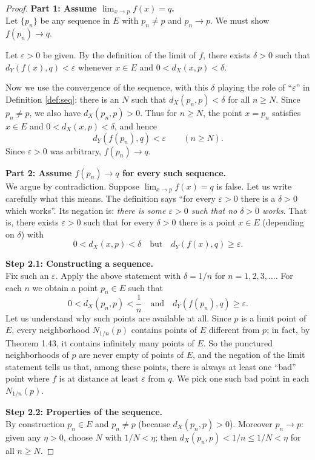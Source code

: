 \documentclass{article}
\theoremstyle{mythm}
\begin{document}
\begin{proof}
\textbf{Part 1: Assume $\lim_{x\to p} f(x) = q$.}\\
Let $\{p_n\}$ be any sequence in $E$ with $p_n \neq p$ and $p_n \to p$. We must show $f(p_n) \to q$.

Let $\varepsilon > 0$ be given. By the definition of the limit of $f$, there exists $\delta > 0$ such that $d_Y(f(x), q) < \varepsilon$ whenever $x \in E$ and $0 < d_X(x,p) < \delta$.

Now we use the convergence of the sequence, with this $\delta$ playing the role of ``$\varepsilon$'' in Definition \ref{def:seq}: there is an $N$ such that $d_X(p_n, p) < \delta$ for all $n \geq N$. Since $p_n \neq p$, we also have $d_X(p_n,p) > 0$. Thus for $n \geq N$, the point $x = p_n$ satisfies $x \in E$ and $0 < d_X(x,p) < \delta$, and hence
\[
d_Y(f(p_n), q) < \varepsilon \qquad (n \geq N).
\]
Since $\varepsilon > 0$ was arbitrary, $f(p_n) \to q$.

\textbf{Part 2: Assume $f(p_n) \to q$ for every such sequence.}\\
We argue by contradiction. Suppose $\lim_{x\to p} f(x) = q$ is false. Let us write carefully what this means. The definition says ``for every $\varepsilon > 0$ there is a $\delta > 0$ which works''. Its negation is: \textit{there is some $\varepsilon > 0$ such that no $\delta > 0$ works}. That is, there exists $\varepsilon > 0$ such that for every $\delta > 0$ there is a point $x \in E$ (depending on $\delta$) with
\[
0 < d_X(x, p) < \delta \quad \text{but} \quad d_Y(f(x), q) \geq \varepsilon.
\]

\textbf{Step 2.1: Constructing a sequence.}\\
Fix such an $\varepsilon$. Apply the above statement with $\delta = 1/n$ for $n = 1, 2, 3, \dots$. For each $n$ we obtain a point $p_n \in E$ such that
\[
0 < d_X(p_n, p) < \frac{1}{n} \quad \text{and} \quad d_Y(f(p_n), q) \geq \varepsilon.
\]
Let us understand why such points are available at all. Since $p$ is a limit point of $E$, every neighborhood $N_{1/n}(p)$ contains points of $E$ different from $p$; in fact, by Theorem 1.43, it contains infinitely many points of $E$. So the punctured neighborhoods of $p$ are never empty of points of $E$, and the negation of the limit statement tells us that, among these points, there is always at least one ``bad'' point where $f$ is at distance at least $\varepsilon$ from $q$. We pick one such bad point in each $N_{1/n}(p)$.

\textbf{Step 2.2: Properties of the sequence.}\\
By construction $p_n \in E$ and $p_n \neq p$ (because $d_X(p_n,p) > 0$). Moreover $p_n \to p$: given any $\eta > 0$, choose $N$ with $1/N < \eta$; then $d_X(p_n,p) < 1/n \leq 1/N < \eta$ for all $n \geq N$.


\end{proof}
\end{document}
